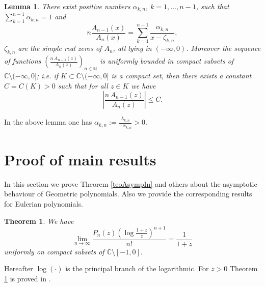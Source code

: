 \documentclass[11pt]{article}
\newtheorem{lemma}{Lemma}
\newtheorem{theo}{Theorem}
\newcommand{\C}{\mathbb{C}}
\begin{document}
\begin{lemma}\label{lem:PF}
There exist positive numbers $\alpha_{k,n}$, $k=1,\dots,n-1$, such that $\sum_{k=1}^{n-1}\alpha_{k,n}=1$ and
\begin{equation}\label{eq:A-PF}
 n\frac{A_{n-1}(x)}{A_n(x)} = \sum_{k=1}^{n-1}\frac{\alpha_{k,n}}{x-\zeta_{k,n}}, 
\end{equation}
 $\zeta_{k,n}$ are the simple real zeros of $A_n$, all lying in $(-\infty,0)$. Moreover the sequence of functions $\left(\frac{n\,A_{n-1}(z)}{A_n(z)}\right)_{n\in\mathbb{N}}$ is uniformly bounded in compact subsets of  $\mathbb{C}\setminus(-\infty,0]$; i.e. if $K\subset \mathbb{C}\setminus(-\infty,0]$ is a compact set, then there exists a constant $C=C(K)>0$ such that for all  $z\in K$ we have
\[
\left|\frac{n\, A_{n-1}(z)}{A_n(z)}\right|\le C.
\]
\end{lemma}
In the above lemma one has $\alpha_{k,n}:=\frac{\lambda_{k,n}}{-x_{k,n}} >0$.


\section{Proof of main results}\label{SectProofMain-Result}

In this section we prove Theorem \ref{teoAsympIn} and others about the  asymptotic behaviour of Geometric polynomials. Also we provide the corresponding results for Eulerian polynomials.

\begin{theo}\label{teoAsymp} We have
\begin{equation}
\label{convForm}
\lim_{n\to\infty}\frac{P_n(z)(\log\frac{1+z}{z})^{n+1}}{n!}=\frac{1}{1+z}
\end{equation}
uniformly on compact subsets of $\overline{\C}\setminus [-1,0].$

\end{theo}

Hereafter $\log(\cdot)$ is the principal branch of the logarithmic. For $z>0$ Theorem \ref{teoAsymp} is proved  in \cite{Bel}. 
\end{document}
